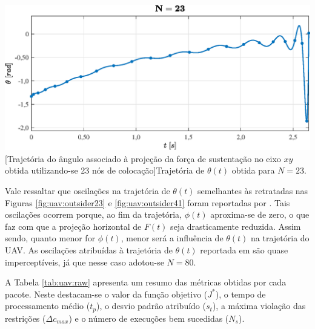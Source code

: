 \noindent	
\begin{minipage}{\textwidth}
	\vspace{\onelineskip}
	\centering
	\includegraphics[scale=0.67]{fig/resultados/uav/obs/outsider23}
	[Trajetória do ângulo associado à projeção da força de sustentação no eixo $xy$ obtida utilizando-se 23 nós de colocação]{Trajetória de $ \theta(t) $ obtida para $ N = 23 $.}
	\label{fig:uav:outsider23}
	\vspace{\onelineskip}
\end{minipage}

Vale ressaltar que oscilações na trajetória de $ \theta(t) $ semelhantes às retratadas nas Figuras \ref{fig:uav:outsider23} e \ref{fig:uav:outsider41} foram reportadas por . Tais oscilações ocorrem porque, ao fim da trajetória, $ \phi(t) $ aproxima-se de zero, o que faz com que a projeção horizontal de $ F(t) $ seja drasticamente reduzida. Assim sendo, quanto menor for $ \phi(t) $, menor será a influência de $ \theta(t) $ na trajetória do UAV. As oscilações atribuídas à trajetória de $ \theta(t) $ reportada em  são quase imperceptíveis, já que nesse caso adotou-se $ N = 80 $.

A  Tabela \ref{tab:uav:raw} apresenta um resumo das métricas obtidas por cada pacote. Neste destacam-se o valor da função objetivo ($ J^* $), o tempo de processamento médio ($ t_p $), o desvio padrão atribuído ($ s_t $), a máxima violação das restrições ($ \Delta c_{max} $) e o número de execuções bem sucedidas ($ N_s $).

